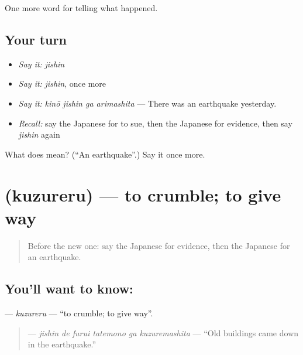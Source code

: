 \begin{grammarlens}[title={What you've built}]
One more word for telling what happened.
\end{grammarlens}

\subsection*{Your turn}
\begin{itemize}
\raggedright
  \item \emph{Say it:} \emph{jishin}
  \item \emph{Say it:} \emph{jishin}, once more
  \item \emph{Say it:} \emph{kinō jishin ga arimashita} — There was an earthquake yesterday.
  \item \emph{Recall:} say the Japanese for to sue, then the Japanese for evidence, then say \emph{jishin} again
\end{itemize}

\begin{tcolorbox}[breakable,colback=teal!4,colframe=teal!35!black,title={Before you move on}]
What does  mean? (\textquotedblleft{}An earthquake\textquotedblright{}.) Say it once more.
\end{tcolorbox}
\section[\texorpdfstring{\ja{くずれる} (kuzureru)}{くずれる (kuzureru)}]{ (kuzureru) — to crumble; to give way}

\label{lesson:JA-C274-kuzureru}



\begin{quote}
Before the new one: say the Japanese for evidence, then the Japanese for an earthquake.
\end{quote}

\subsection*{You'll want to know: }
\textbf{} — \emph{kuzureru} — \textquotedblleft{}to crumble; to give way\textquotedblright{}.

\begin{quote}
\textbf{   } — \emph{jishin de furui tatemono ga kuzuremashita} — \textquotedblleft{}Old buildings came down in the earthquake.\textquotedblright{}
\end{quote}

